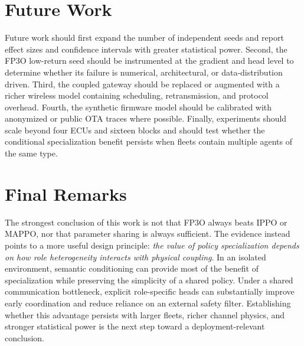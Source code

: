 \documentclass{iutbscthesis}
\begin{document}
\section{Future Work}
Future work should first expand the number of independent seeds and report effect sizes and confidence intervals with greater statistical power. Second, the FP3O low-return seed should be instrumented at the gradient and head level to determine whether its failure is numerical, architectural, or data-distribution driven. Third, the coupled gateway should be replaced or augmented with a richer wireless model containing scheduling, retransmission, and protocol overhead. Fourth, the synthetic firmware model should be calibrated with anonymized or public OTA traces where possible. Finally, experiments should scale beyond four ECUs and sixteen blocks and should test whether the conditional specialization benefit persists when fleets contain multiple agents of the same type.

\section{Final Remarks}
The strongest conclusion of this work is not that FP3O always beats IPPO or MAPPO, nor that parameter sharing is always sufficient. The evidence instead points to a more useful design principle: \emph{the value of policy specialization depends on how role heterogeneity interacts with physical coupling}. In an isolated environment, semantic conditioning can provide most of the benefit of specialization while preserving the simplicity of a shared policy. Under a shared communication bottleneck, explicit role-specific heads can substantially improve early coordination and reduce reliance on an external safety filter. Establishing whether this advantage persists with larger fleets, richer channel physics, and stronger statistical power is the next step toward a deployment-relevant conclusion.

\printbib
\end{document}
